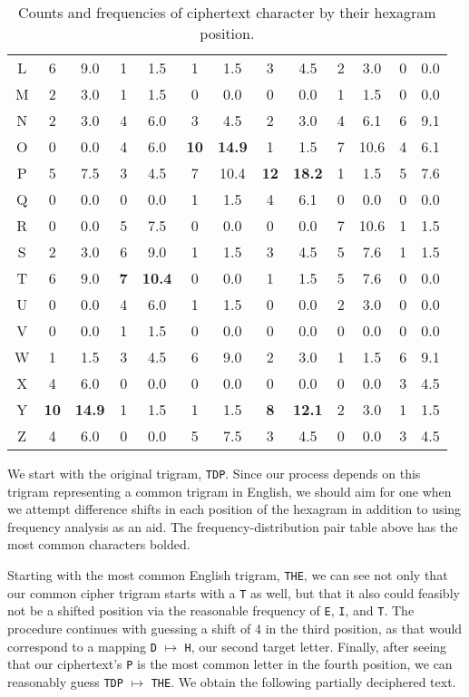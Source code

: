 \documentclass[12pt]{article}
\theoremstyle{remark}  %
\begin{document}
\begin{table}[h]
\begin{center}
\begin{tabular}{c|cc|cc|cc|cc|cc|cc|}
                L & 6 & 9.0 & 1 & 1.5 & 1 & 1.5 & 3 & 4.5 & 2 & 3.0 & 0 & 0.0 \\
                M & 2 & 3.0 & 1 & 1.5 & 0 & 0.0 & 0 & 0.0 & 1 & 1.5 & 0 & 0.0 \\
                N & 2 & 3.0 & 4 & 6.0 & 3 & 4.5 & 2 & 3.0 & 4 & 6.1 & 6 & 9.1 \\
                O & 0 & 0.0 & 4 & 6.0 & \textbf{10} & \textbf{14.9} & 1 & 1.5 & 7 & 10.6 & 4 & 6.1 \\
                P & 5 & 7.5 & 3 & 4.5 & 7 & 10.4 & \textbf{12} & \textbf{18.2} & 1 & 1.5 & 5 & 7.6 \\
                Q & 0 & 0.0 & 0 & 0.0 & 1 & 1.5 & 4 & 6.1 & 0 & 0.0 & 0 & 0.0 \\
                R & 0 & 0.0 & 5 & 7.5 & 0 & 0.0 & 0 & 0.0 & 7 & 10.6 & 1 & 1.5 \\
                S & 2 & 3.0 & 6 & 9.0 & 1 & 1.5 & 3 & 4.5 & 5 & 7.6 & 1 & 1.5 \\
                T & 6 & 9.0 & \textbf{7} & \textbf{10.4} & 0 & 0.0 & 1 & 1.5 & 5 & 7.6 & 0 & 0.0 \\
                U & 0 & 0.0 & 4 & 6.0 & 1 & 1.5 & 0 & 0.0 & 2 & 3.0 & 0 & 0.0 \\
                V & 0 & 0.0 & 1 & 1.5 & 0 & 0.0 & 0 & 0.0 & 0 & 0.0 & 0 & 0.0 \\
                W & 1 & 1.5 & 3 & 4.5 & 6 & 9.0 & 2 & 3.0 & 1 & 1.5 & 6 & 9.1 \\
                X & 4 & 6.0 & 0 & 0.0 & 0 & 0.0 & 0 & 0.0 & 0 & 0.0 & 3 & 4.5 \\
                Y & \textbf{10} & \textbf{14.9} & 1 & 1.5 & 1 & 1.5 & \textbf{8} & \textbf{12.1} & 2 & 3.0 & 1 & 1.5 \\
                Z & 4 & 6.0 & 0 & 0.0 & 5 & 7.5 & 3 & 4.5 & 0 & 0.0 & 3 & 4.5 \\
            \end{tabular}
        \end{center}
        \captionsetup{labelformat=empty}
        \caption*{Counts and frequencies of ciphertext character by their hexagram position.}
    \end{table}
    We start with the original trigram, \texttt{TDP}. Since our process depends on this trigram representing a common trigram in English, we should aim for one when we attempt difference shifts in each position of the hexagram in addition to using frequency analysis as an aid. The frequency-distribution pair table above has the most common characters bolded. \par Starting with the most common English trigram, \texttt{THE}, we can see not only that our common cipher trigram starts with a \texttt{T} as well, but that it also could feasibly not be a shifted position via the reasonable frequency of \texttt{E}, \texttt{I}, and \texttt{T}. The procedure continues with guessing a shift of 4 in the third position, as that would correspond to a mapping \texttt{D} $\mapsto$ \texttt{H}, our second target letter. Finally, after seeing that our ciphertext's \texttt{P} is the most common letter in the fourth position, we can reasonably guess \texttt{TDP} $\mapsto$ \texttt{THE}. We obtain the following partially deciphered text.
\end{document}
